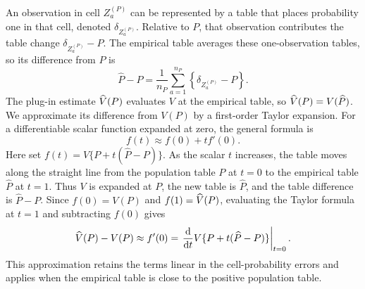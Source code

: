 An observation in cell \(Z_a^{(P)}\) can be represented by a table that places
probability one in that cell, denoted \(\delta_{Z_a^{(P)}}\). Relative to
\(P\), that observation contributes the table change
\(\delta_{Z_a^{(P)}}-P\). The empirical table averages these one-observation
tables, so its difference from \(P\) is
\begin{equation}
  \widehat P-P
  =\frac{1}{n_P}\sum_{a=1}^{n_P}
  \left\{\delta_{Z_a^{(P)}}-P\right\}.
\end{equation}
The plug-in estimate \(\widehat V(P)\) evaluates \(V\) at the empirical table,
so \(\widehat V(P)=V(\widehat P)\). We approximate its difference from \(V(P)\)
by a first-order Taylor expansion. For a differentiable scalar function
expanded at zero, the general formula is
\begin{equation*}
  f(t)\approx f(0)+t f'(0).
\end{equation*}
Here set \(f(t)=V\{P+t(\widehat P-P)\}\). As the scalar \(t\) increases,
the table moves along the straight line from the population table \(P\) at
\(t=0\) to the empirical table \(\widehat P\) at \(t=1\). Thus \(V\) is expanded at \(P\), the
new table is \(\widehat P\), and the table difference is
\(\widehat P-P\). Since \(f(0)=V(P)\) and \(f(1)=\widehat V(P)\), evaluating
the Taylor formula at \(t=1\) and subtracting \(f(0)\) gives
\begin{equation*}
  \widehat V(P)-V(P)
  \approx f'(0)
  =\left.\frac{\mathrm d}{\mathrm dt}
    V\{P+t(\widehat P-P)\}\right|_{t=0}.
\end{equation*}
This approximation retains the terms linear in the cell-probability errors
and applies when the empirical table is close to the positive population
table.

